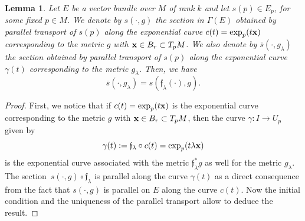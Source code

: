 \documentclass[10pt,a4paper]{amsart}
\numberwithin{equation}{section}
\newtheorem{lem}[thm]{Lemma}
\theoremstyle{definition}
\begin{document}
\begin{lem} \label{ref:eq:patrgglambda} Let $E$ be a vector bundle over $M$ of rank $k$ and let $s(p)\in E_p$, for some fixed $p\in M$. We denote by $s(\cdot,g)$ the section in $\Gamma(E)$ obtained by parallel transport of $s(p)$ along the exponential curve $c(t)={\rm exp}_p(t{\bf x})$ corresponding to the metric $g$ with ${\bf x}\in B_r\subset T_pM$. We also denote by $\overline{s}(\cdot,g_\lambda)$ the section obtained by parallel transport of $s(p)$ along the exponential curve~$\gamma(t)$ corresponding to the metric $g_\lambda$. Then, we have
\[\overline{s}(\cdot,g_\lambda)=s(\mathfrak{f}_\lambda(\cdot),g).\]
\end{lem}
\begin{proof}
First, we notice that if $c(t)={\rm exp}_p(t{\bf x})$ is the exponential curve corresponding to the metric $g$ with ${\bf x}\in B_r\subset T_pM$, then the curve $\gamma\colon I\to U_p$ given by
\[\gamma(t):=\mathfrak{f}_\lambda\circ c(t)={\rm exp}_p(t\lambda{\bf x})\] is the exponential curve associated with the metric $\mathfrak{f}_\lambda^*g$ as well for the metric $g_\lambda$.
The section~$s(\cdot,g)\circ\mathfrak{f}_\lambda$ is parallel along the curve $\gamma(t)$ as a direct consequence from the fact that $s(\cdot,g)$ is parallel on $E$ along the curve $c(t)$. Now the initial condition and the uniqueness of the parallel transport allow to deduce the result.
\end{proof}
\end{document}
